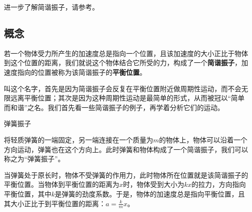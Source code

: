 
\begin{issues}
\issueDraft
\end{issues}

进一步了解简谐振子，请参考。


\subsection{概念}


若一个物体受力所产生的加速度总是指向一个位置，且该加速度的大小正比于物体到这个位置的距离，我们就说这个物体结合它所受的力，构成了一个\textbf{简谐振子}，加速度指向的位置被称为该简谐振子的\textbf{平衡位置}。

叫这个名字，首先是因为简谐振子会反复在平衡位置附近做周期性运动，而不会无限远离平衡位置；其次是因为这种周期性运动是最简单的形式，从而被冠以“简单而和谐”之名。我们首先看一些简谐振子的例子，再学着分析它们的运动。




\begin{example}{弹簧振子}

将轻质弹簧的一端固定，另一端连接在一个质量为$m$的物体上，物体可以沿着一个方向运动，弹簧也在这个方向上。此时弹簧和物体构成了一个简谐振子，我们可以称之为“弹簧振子”。

当弹簧处于原长时，物体不受弹簧的作用力，此时物体所在位置就是该简谐振子的平衡位置。当物体到平衡位置的距离为$x$时，物体受到大小为$kx$的拉力，方向指向平衡位置，其中$k$是弹簧的劲度系数。于是，物体的加速度总是指向平衡位置，且其大小正比于到平衡位置的距离：$a=\frac{k}{m}x$。

\end{example}


